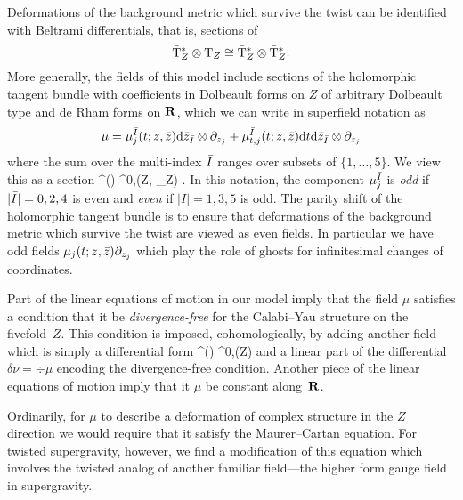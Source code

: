 \documentclass[../main.tex]{subfiles}
\begin{document}
Deformations of the background metric which survive the twist can be identified with Beltrami differentials, that is, sections of 
\[
\Bar{{\mathrm{T}}}_Z^* \otimes {\mathrm{T}}_Z \cong \Bar{{\mathrm{T}}}^*_Z \otimes \Bar{{\mathrm{T}}}_Z^* . 
\]
More generally, the fields of this model include sections of the holomorphic tangent bundle with coefficients in Dolbeault forms on $Z$ of arbitrary Dolbeault type and de Rham forms on $\mathbf{R}$, which we can write in superfield notation as 
\[
\mu = \mu^{\Bar{I}}_j (t;z,\bar{z}) \mathrm{d} \bar{z}_{\Bar{I}} \otimes \partial_{z_j} + \mu^{\Bar{I}}_{t,j} (t;z,\bar{z}) \mathrm{d} t \mathrm{d} \bar{z}_{\Bar{I}} \otimes \partial_{z_j}
\]
where the sum over the multi-index $\Bar{I}$ ranges over subsets of $\{1,\ldots,5\}$.
We view this as a section
\beqn
\mu \in \Omega^\bu(\R) \otimes \Omega^{0,\bu}(Z, \Pi \T_Z) .
\eeqn
In this notation, the component $\mu^{\Bar{I}}_j$ is {\em odd} if $|\Bar{I}|=0,2,4$ is even and {\em even} if $|I| = 1,3,5$ is odd.
The parity shift of the holomorphic tangent bundle is to ensure that deformations of the background metric which survive the twist are viewed as even fields.
In particular we have odd fields $\mu_j(t;z,\bar{z}) \partial_{z_j}$ which play the role of ghosts for infinitesimal changes of coordinates.

Part of the linear equations of motion in our model imply that the field $\mu$ satisfies a condition that it be {\em divergence-free} for the Calabi--Yau structure on the fivefold~$Z$.
This condition is imposed, cohomologically, by adding another field which is simply a differential form
\beqn
\nu \in \Omega^\bu(\R) \otimes \Omega^{0,\bu}(Z) 
\eeqn
and a linear part of the differential $\delta \nu = \div \mu$ encoding the divergence-free condition.
Another piece of the linear equations of motion imply that it $\mu$ be constant along~$\mathbf{R}$. 

Ordinarily, for $\mu$ to describe a deformation of complex structure in the $Z$ direction we would require that it satisfy the Maurer--Cartan equation.
For twisted supergravity, however, we find a modification of this equation which involves the twisted analog of another familiar field---the higher form gauge field in supergravity.
\end{document}
